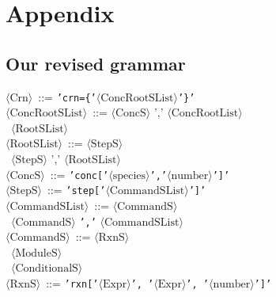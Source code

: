 \section{Appendix}
\subsection{Our revised grammar}\label{sec:grammar_revised}
\begin{tabbing}
    $\langle \text{Crn} \rangle$ \,::=\; \= \texttt{'crn=\{'$\langle \text{ConcRootSList} \rangle$'\}'} \\
    
    $\langle \text{ConcRootSList} \rangle$ \,::=\;  $\langle \text{ConcS} \rangle$ ',' $\langle \text{ConcRootList} \rangle$ \\
    
     \>\textbar \, $\langle \text{RootSList} \rangle$ \\

      $\langle \text{RootSList} \rangle$ \,::=\;  $\langle \text{StepS} \rangle$ \\

      \>\textbar \, $\langle \text{StepS} \rangle$ ',' $\langle \text{RootSList} \rangle$ \\
     
    $\langle \text{ConcS} \rangle$ \,::=\;  \texttt{'conc['$\langle \text{species} \rangle$','$\langle \text{number} \rangle$']'} \\
    
    $\langle \text{StepS} \rangle$ \,::=\;  \texttt{'step['$\langle \text{CommandSList} \rangle$']'} \\
    
    $\langle \text{CommandSList} \rangle$ \,::=\;  $\langle \text{CommandS} \rangle$ \\
    
     \>\textbar \, $\langle \text{CommandS} \rangle$ \texttt{','} $\langle \text{CommandSList} \rangle$ \\
     
    $\langle \text{CommandS} \rangle$ \,::=\;  $\langle \text{RxnS} \rangle$ \\
    
     \>\textbar \, $\langle \text{ModuleS} \rangle$ \\
     
     \>\textbar \, $\langle \text{ConditionalS} \rangle$ \\
     
    $\langle \text{RxnS} \rangle$ \,::=\;  \texttt{'rxn['$\langle \text{Expr} \rangle$', '$\langle \text{Expr} \rangle$', '$\langle \text{number} \rangle$']'} \\
    

\end{tabbing}
